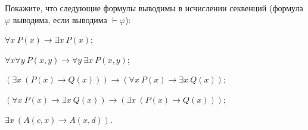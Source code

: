 Покажите, что следующие формулы выводимы в исчислении секвенций (формула $\varphi$ выводима, если
выводима $\vdash \varphi$):
\begin{enumcyr}
    \item $\forall x~P(x) \to \exists x~P(x)$;
    \item $\forall x \forall y~P(x, y) \to \forall y~\exists x~P(x, y)$;
    \item $(\exists x~(P(x) \to Q(x))) \to (\forall x~P(x) \to \exists x~Q(x))$;
    \item $(\forall x~P(x) \to \exists x~Q(x)) \to (\exists x~(P(x) \to Q(x)))$;
    \item $\exists x~(A(c, x) \to A(x, d))$.
\end{enumcyr}

